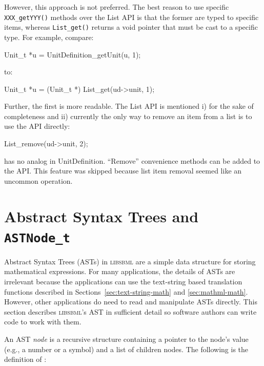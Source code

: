 \documentclass{cekmanual}
\newcommand{\libsbml}{\textsc{libsbml}}
\begin{document}
However, this approach is not preferred.  The best reason to use
specific \texttt{XXX\_getYYY()} methods over the List API is that the
former are typed to specific items, whereas \texttt{List\_get()}
returns a void pointer that must be cast to a specific type.  For
example, compare:

\begin{example}[c]
Unit_t *u = UnitDefinition_getUnit(u, 1);
\end{example}

to:

\begin{example}[c]
Unit_t *u = (Unit_t *) List_get(ud->unit, 1);
\end{example}

Further, the first is more readable.  The List API is mentioned i) for
the sake of completeness and ii) currently the only way to remove an
item from a list is to use the API directly:

\begin{example}[c]
List_remove(ud->unit, 2);
\end{example}

has no analog in UnitDefinition.  ``Remove'' convenience methods can be
added to the API.  This feature was skipped because list item removal
seemed like an uncommon operation.


\section{Abstract Syntax Trees and \texttt{ASTNode\_t}}
\label{app:ast}

Abstract Syntax Trees (ASTs) in \libsbml{} are a simple data structure for
storing mathematical expressions.  For many applications, the details of
ASTs are irrelevant because the applications can use the text-string based
translation functions described in Sections~\ref{sec:text-string-math} and
\ref{sec:mathml-math}.  However, other applications do need to read and
manipulate ASTs directly.  This section describes \libsbml{}'s AST in
sufficient detail so software authors can write code to work with them.

An AST \emph{node} is a recursive structure containing a pointer to the
node's value (e.g., a number or a symbol) and a list of children nodes.
The following is the definition of :
\end{document}
